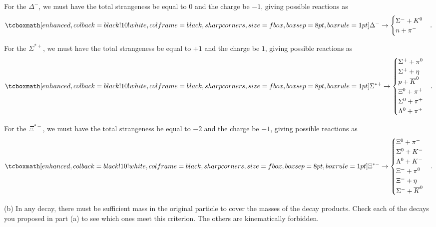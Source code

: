 For the $\Delta^{-}$, we must have the total strangeness be equal to $0$ and the charge be $-1$, giving possible reactions as
\begin{align}
    \label{eq:decay-modes-delta}
    \eqbox{
    \Delta^{-} \rightarrow 
    \begin{cases}
    \Sigma^{-} + K^{0} \\
    n + \pi^{-}
    \end{cases}
}
.\end{align}

For the $\Sigma^{*+}$, we must have the total strangeness be equal to $+1$ and the charge be $1$, giving possible reactions as
\begin{eqnarray}
    \label{eq:decay-modes-sig_star_plus}
    \eqbox{
    \Sigma^{*+} \rightarrow 
    \begin{cases}
    \Sigma^{+} + \pi^{0} \\
    \Sigma^{+} + \eta \\
    p + \overline{K}^{0} \\
    \Xi^{0} + \pi^{+} \\
    \Sigma^{0} + \pi^{+} \\
    \Lambda^{0} + \pi^{+}
    \end{cases}
    }    
.\end{eqnarray}

For the $\Xi^{*-}$, we must have the total strangeness be equal to $-2$ and the charge be $-1$, giving possible reactions as 
\begin{eqnarray}
    \label{eq:decay-modes-Xi_star_minus}
    \eqbox{
    \Xi^{*-} \rightarrow 
    \begin{cases}
    \Xi^{0} + \pi^{-} \\
    \Sigma^{0} + K^{-} \\
    \Lambda^{0} + K^{-} \\
    \Xi^{-} + \pi^{0} \\
    \Xi^{-} + \eta \\
    \Sigma^{-} + \overline{K}^{0}
    \end{cases}
}
.\end{eqnarray}


(b) In any decay, there must be sufficient mass in the original particle to cover the masses of the decay products.
Check each of the decays you proposed in part (a) to see which ones meet this criterion.
The others are kinematically forbidden.

